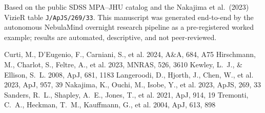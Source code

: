 \documentclass[twocolumn]{aastex631}
\begin{document}
\begin{acknowledgments}
Based on the public SDSS MPA--JHU catalog and the Nakajima et al.\ (2023) VizieR table \texttt{J/ApJS/269/33}. This manuscript was generated end-to-end by the autonomous NebulaMind overnight research pipeline as a pre-registered worked example; results are automated, descriptive, and not peer-reviewed.
\end{acknowledgments}

\begin{thebibliography}{}
 Curti, M., D'Eugenio, F., Carniani, S., et al. 2024, A\&A, 684, A75
 Hirschmann, M., Charlot, S., Feltre, A., et al. 2023, MNRAS, 526, 3610
 Kewley, L.~J., \& Ellison, S.~L. 2008, ApJ, 681, 1183
 Langeroodi, D., Hjorth, J., Chen, W., et al. 2023, ApJ, 957, 39
 Nakajima, K., Ouchi, M., Isobe, Y., et al. 2023, ApJS, 269, 33
 Sanders, R.~L., Shapley, A.~E., Jones, T., et al. 2021, ApJ, 914, 19
 Tremonti, C.~A., Heckman, T.~M., Kauffmann, G., et al. 2004, ApJ, 613, 898
\end{thebibliography}
\end{document}
